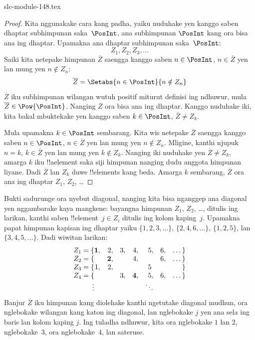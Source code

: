 \begin{filecontents*}[overwrite]{slc-module-148.tex}
\begin{proof}
Kita nggunakake cara kang padha, yaiku nuduhake yen kanggo saben dhaptar
subhimpunan saka~$\PosInt$, ana subhimpunan $\PosInt$ kang ora bisa ana
ing dhaptar. Upamakna ana dhaptar subhimpunan saka~$\PosInt$:
\[
Z_{1}, Z_{2}, Z_{3}, \dots
\]
Saiki kita netepake himpunan $\overline{Z}$ saengga kanggo saben $n \in \PosInt$,
$n \in \overline{Z}$ yen lan mung yen $n \notin Z_{n}$:
\[
\overline{Z} = \Setabs{n \in \PosInt}{n \notin Z_n}
\]
$\overline{Z}$ iku subhimpunan wilangan wutuh positif miturut definisi ing ndhuwur, mula $\overline{Z} \in
\Pow{\PosInt}$. Nanging $\overline{Z}$ ora bisa ana ing dhaptar.
Kanggo nuduhake iki, kita bakal mbuktekake yen kanggo saben $k \in \PosInt$,
$\overline{Z} \neq Z_k$.

Mula upamakna $k \in \PosInt$ sembarang. Kita wis netepake $\overline{Z}$
saengga kanggo saben $n \in \PosInt$, $n \in \overline{Z}$ yen lan mung yen
$n \notin Z_n$. Mligine, kanthi njupuk $n=k$, $k \in \overline{Z}$
yen lan mung yen $k \notin Z_k$. Nanging iki nuduhake
yen $\overline{Z} \neq Z_k$, amarga $k$ iku !!a{element} saka siji
himpunan nanging dudu anggota himpunan liyane. Dadi $\overline{Z}$ lan $Z_k$
duwe !!{element}s kang beda. Amarga $k$ sembarang, $\overline{Z}$
ora ana ing dhaptar $Z_1$, $Z_2$, \dots
\end{proof}

\begin{explain}
Bukti sadurunge ora nyebut diagonal, nanging kita bisa nganggep
ana diagonal yen nggambarake kaya mangkene: bayangna himpunan
$Z_1$, $Z_2$, \dots, ditulis ing larikan, kanthi saben
!!{element}~$j \in Z_i$ ditulis ing kolom kaping~$j$. Upamakna
papat himpunan kapisan ing dhaptar yaiku $\{1,2,3,\dots\}$, $\{2, 4, 6, \dots\}$,
$\{1,2,5\}$, lan $\{3,4,5,\dots\}$. Dadi wiwitan larikan:
\[
\begin{array}{r@{}rrrrrrr}
  Z_1 = \{ & \mathbf{1}, & 2, & 3, & 4, & 5, & 6, & \dots\}\\
  Z_2 = \{ &  & \mathbf{2}, &  & 4, &  & 6, & \dots\}\\
  Z_3 = \{ & 1, & 2, &  &  & 5\phantom{,} &  & \}\\
  Z_4 = \{ &  &  & 3, & \mathbf{4}, & 5, & 6, & \dots\}\\
  \vdots & & & & & \ddots
\end{array}
\]
Banjur $\overline{Z}$ iku himpunan kang diolehake kanthi ngetutake diagonal
mudhun, ora nglebokake wilangan kang katon ing diagonal, lan nglebokake
$j$ yen ana sela ing baris lan kolom kaping $j$.
Ing tuladha ndhuwur, kita ora nglebokake $1$ lan $2$, nglebokake~$3$,
ora nglebokake~$4$, lan sateruse.
\end{explain}


\end{filecontents*}
